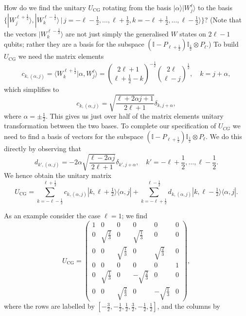 \documentclass[12pt]{amsart}
\theoremstyle{definition}
\theoremstyle{remark}
\numberwithin{equation}{section}
\begin{document}
How do we find the unitary $U_{\text{CG}}$ rotating from the basis $|\alpha\rangle|W_j^{\ell}\rangle$ to the basis $\{|W_j^{\ell+\frac12}\rangle, |W_k^{\ell-\frac12}\rangle\,|\, j = -\ell-\frac12,\ldots, \ell+\frac12, k = -\ell+\frac12, \ldots, \ell - \frac12\rangle\}$? (Note that the vectors $|W_k^{\ell-\frac12}\rangle$ are not just simply the generalised $W$ states on $2\ell-1$ qubits; rather they are a basis for the subspace $(\mathbb{I} - P_{\ell+\frac12})\mathbb{I}_{\frac12}\otimes P_{\ell}$.) To build $U_{\text{CG}}$ we need the matrix elements
\begin{equation}
	c_{k,(\alpha,j)} = \langle W_k^{\ell+\frac12}|\alpha, W_j^{\ell}\rangle = \binom{2\ell+1}{\ell+\frac12-k}^{-\frac12}\binom{2\ell}{\ell-j}^{\frac12}, \quad k = j+\alpha,
\end{equation}
which simplifies to
\begin{equation}
	c_{k,(\alpha,j)} = \sqrt{\frac{\ell+2\alpha j + 1}{2\ell+1}}\delta_{k, j + \alpha},
\end{equation}
where $\alpha = \pm\frac12$. This gives us just over half of the matrix elements unitary transformation between the two bases. To complete our specification of $U_{CG}$ we need to find a basis of vectors for the subspace $(\mathbb{I} - P_{\ell+\frac12})\mathbb{I}_{\frac12}\otimes P_{\ell}$. We do this directly by observing that 
\begin{equation}
	d_{k',(\alpha,j)} = -2\alpha\sqrt{\frac{\ell-2\alpha j}{2\ell+1}}\delta_{k', j+\alpha}, \quad k' = -\ell+\frac12, \ldots, \ell-\frac12. 
\end{equation}
We hence obtain the unitary matrix
\begin{equation}
	U_{\text{CG}} = \sum_{k = -\ell-\frac12}^{\ell+\frac12} c_{k,(\alpha,j)} |k,\ell+\tfrac12\rangle \langle \alpha, j| + \sum_{k = -\ell+\frac12}^{\ell-\frac12} d_{k,(\alpha,j)}|k,\ell-\tfrac12\rangle\langle \alpha, j|.
\end{equation}

As an example consider the case $\ell = 1$; we find
\begin{equation}
	U_{\text{CG}} = 
	\begin{pmatrix}
		1 & 0 & 0 & 0 & 0 & 0   \\
		0 & \sqrt{\tfrac23} & 0 & \sqrt{\tfrac13} & 0 & 0  \\
		0 & 0 & \sqrt{\tfrac13} & 0 & \sqrt{\tfrac23} & 0  \\
		0 & 0 & 0 & 0 & 0 & 1  \\
		0 & \sqrt{\tfrac13} & 0 & -\sqrt{\tfrac23} & 0 & 0  \\
		0 & 0 & \sqrt{\tfrac23} & 0 & -\sqrt{\tfrac13} & 0  
	\end{pmatrix},
\end{equation}
where the rows are labelled by $[-\tfrac32, -\tfrac12, \tfrac12, \tfrac32, -\tfrac12, \tfrac12]$, and the columns by 
\end{document}

